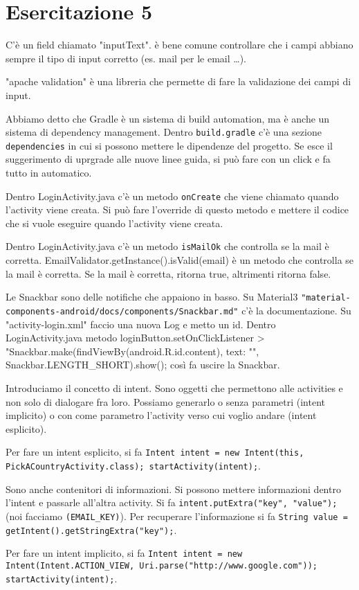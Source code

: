 
\chapter{Esercitazione 5}
C'è un field chiamato "inputText". è bene comune controllare che i campi abbiano sempre il tipo di input corretto (es. mail per le email \dots).
\par "apache validation" è una libreria che permette di fare la validazione dei campi di input.
\par Abbiamo detto che Gradle è un sistema di build automation, ma è anche un sistema di dependency management. Dentro \texttt{build.gradle} c'è una sezione \texttt{dependencies} in cui si possono mettere le dipendenze del progetto. Se esce il suggerimento di uprgrade alle nuove linee guida, si può fare con un click e fa tutto in automatico.
\par Dentro LoginActivity.java c'è un metodo \texttt{onCreate} che viene chiamato quando l'activity viene creata. Si può fare l'override di questo metodo e mettere il codice che si vuole eseguire quando l'activity viene creata.
\par Dentro LoginActivity.java c'è un metodo \texttt{isMailOk} che controlla se la mail è corretta. EmailValidator.getInstance().isValid(email) è un metodo che controlla se la mail è corretta. Se la mail è corretta, ritorna true, altrimenti ritorna false.
\par Le Snackbar sono delle notifiche che appaiono in basso. Su Material3 \texttt{"material-components-android/docs/components/Snackbar.md"} c'è la documentazione. Su "activity-login.xml" faccio una nuova Log e metto un id. Dentro LoginActivity.java metodo loginButton.setOnClickListener > "Snackbar.make(findViewBy(android.R.id.content), text: "", Snackbar.LENGTH_SHORT).show(); così fa uscire la Snackbar.
\par Introduciamo il concetto di intent. Sono oggetti che permettono alle activities e non solo di dialogare fra loro. Possiamo generarlo o senza parametri (intent implicito) o con come parametro l'activity verso cui voglio andare (intent esplicito).
\par Per fare un intent esplicito, si fa \texttt{Intent intent = new Intent(this, PickACountryActivity.class); startActivity(intent);}. 
\par Sono anche contenitori di informazioni. Si possono mettere informazioni dentro l'intent e passarle all'altra activity. Si fa \texttt{intent.putExtra("key", "value");} (noi facciamo \texttt{(EMAIL\_KEY)}). Per recuperare l'informazione si fa \texttt{String value = getIntent().getStringExtra("key");}.
\par Per fare un intent implicito, si fa \texttt{Intent intent = new Intent(Intent.ACTION\_VIEW, Uri.parse("http://www.google.com")); startActivity(intent);}.


